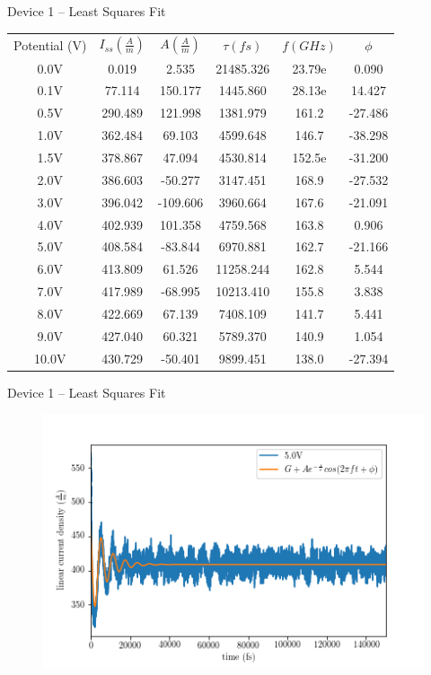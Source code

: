 \documentclass{beamer}
\begin{document}
\begin{frame}{Device 1 -- Least Squares Fit}
    \begin{table}[]
        \small
        \centering
        \begin{tabular}{c|c c c c c}
            Potential (V) & $I_{ss} \left( \frac{A}{m} \right)$ & $A \left( \frac{A}{m} \right)$ & $\tau (fs)$ & $f ({GHz})$ & $\phi$ \\
            0.0V & 0.019 & 2.535 & 21485.326 & 23.79e & 0.090 \\
            0.1V & 77.114 & 150.177 & 1445.860 & 28.13e & 14.427 \\
            0.5V & 290.489 & 121.998 & 1381.979 & 161.2 & -27.486 \\
            1.0V & 362.484 & 69.103 & 4599.648 & 146.7 & -38.298 \\
            1.5V & 378.867 & 47.094 & 4530.814 & 152.5e & -31.200 \\
            2.0V & 386.603 & -50.277 & 3147.451 & 168.9 & -27.532 \\
            3.0V & 396.042 & -109.606 & 3960.664 & 167.6 & -21.091 \\
            4.0V & 402.939 & 101.358 & 4759.568 & 163.8 & 0.906 \\
            5.0V & 408.584 & -83.844 & 6970.881 & 162.7 & -21.166 \\
            6.0V & 413.809 & 61.526 & 11258.244 & 162.8 & 5.544 \\
            7.0V & 417.989 & -68.995 & 10213.410 & 155.8 & 3.838 \\
            8.0V & 422.669 & 67.139 & 7408.109 & 141.7 & 5.441 \\
            9.0V & 427.040 & 60.321 & 5789.370 & 140.9 & 1.054 \\
            10.0V & 430.729 & -50.401 & 9899.451 & 138.0 & -27.394 \\
        \end{tabular}
        \label{tab:dev_1}
    \end{table}
\end{frame}

\begin{frame}{Device 1 -- Least Squares Fit}
    \begin{figure}
        \centering
        \includegraphics[scale=0.5]{Figures/Device_1/Curve_fit/5_0V.png}
        \label{fig:dev_1_lsq}
    \end{figure}
\end{frame}
\end{document}
